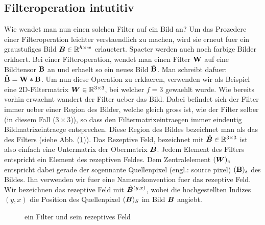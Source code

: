 \subsection{Filteroperation intutitiv}\label{sec:filteroperation_intuitiv}
Wie wendet man nun einen solchen Filter auf ein Bild an? Um das Prozedere einer
Filteroperation leichter verstaendlich zu machen, wird sie erneut fuer ein
graustufiges Bild $\bm{B} \in \mathbb{R}^{h \times w}$ erlauetert. Spaeter werden auch noch farbige
Bilder erklaert.
\para{}
Bei einer Filteroperation, wendet man einen Filter $\mathbf{W}$ auf eine Bildtensor
$\mathbf{B}$ an und erhaelt so ein neues Bild $\tilde{\mathbf{B}}$. Man schreibt dafuer:
$\tilde{\mathbf{B}} = \mathbf{W} * \mathbf{B}$.
\para{}
Um nun diese Operation zu erklaeren, verwenden wir als Beispiel eine
2D-Filtermatrix $\bm{W} \in \mathbb{R}^{3 \times 3}$, bei welcher
$f = 3$ gewaehlt wurde.
Wie bereits vorhin erwaehnt wandert der Filter ueber das Bild. Dabei befindet
sich der Filter immer ueber einer Region des Bilder, welche gleich gross ist,
wie der Filter selber (in diesem Fall ($3 \times 3$)), so dass den Filtermatrixeintraegen immer eindeutig
Bildmatrixeintraege entsprechen. Diese Region des Bildes bezeichnet man als das
 des Filters (siehe Abb. (\ref{fig:receptive_field})).
Das Rezeptive Feld, bezeichnet mit $\hat{\bm{B}} \in \mathbb{R}^{3 \times 3}$ ist also einfach eine
Untermatrix der Obermatrix $\bm{B}$.
\para{}
Jedem Element des Filters entspricht ein Element des rezeptiven Feldes. Dem
Zentralelement $(\bm{W})_c$ entspricht dabei gerade der sogennante Quellenpixel
(engl.: source pixel) $(\mathbf{B})_s$ des Bildes. Ihn verwenden wir fuer eine
Namenskonvention fuer das rezeptive Feld. Wir bezeichnen das rezeptive Feld mit
$\hat{\bm{B}}^{(y,x)}$, wobei die hochgestellten Indizes $(y,x)$ die Position
des Quellenpixel $(\bm{B})_S$ im Bild $\bm{B}$ angiebt.

\begin{figure}[h!]

  \caption{ein Filter und sein rezeptives Feld}
  \label{fig:receptive_field}
\end{figure}


